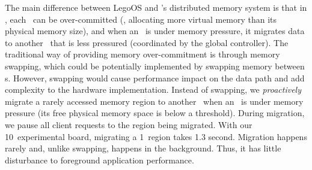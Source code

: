 The main difference between LegoOS and \sys's distributed memory system is that in \sys, each \MN\ can be over-committed (\ie, allocating more virtual memory than its physical memory size), and when an \MN\ is under memory pressure, it migrates data to another \MN\ that is less pressured (coordinated by the global controller).
The traditional way of providing memory over-commitment is through memory swapping, which could be potentially implemented by swapping memory between \MN{}s. 
However, swapping would cause performance impact on the data path and add complexity to the hardware implementation.
Instead of swapping, we \textit{proactively} migrate a rarely accessed memory region to another \MN\ when an \MN\ is under memory pressure (its free physical memory space is below a threshold).
During migration, we pause all client requests to the region being migrated.
With our 10\Gbps\ experimental board, migrating a 1\GB\ region takes 1.3 second.
Migration happens rarely and, unlike swapping, happens in the background.
Thus, it has little disturbance to foreground application performance.


